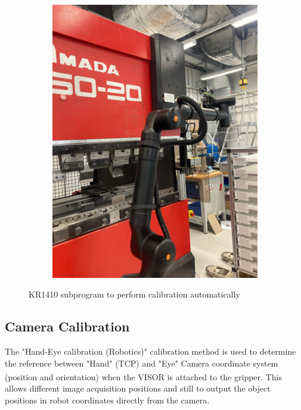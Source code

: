 \begin{figure}[h]
\begin{subfigure}{0.48\textwidth}
        \includegraphics[width=\textwidth, angle=0]{figures/001calibration/calibration-process-right.jpeg} %
        \label{fig:calibration-process-right}
    \end{subfigure}
    \caption{KR1410 subprogram to perform calibration automatically}
    \label{fig:auto-calibration-process}
\end{figure}

\subsection{Camera Calibration}
The "Hand-Eye calibration (Robotics)" calibration method is used to determine the
reference between "Hand" (TCP) and "Eye" Camera coordinate system
(position and orientation) when the VISOR\textsuperscript{\textregistered} is attached to the gripper.
This allows different image acquisition positions and still to output the object positions
in robot coordinates directly from the camera.
\cite[page 102]{visor_user_manual}

